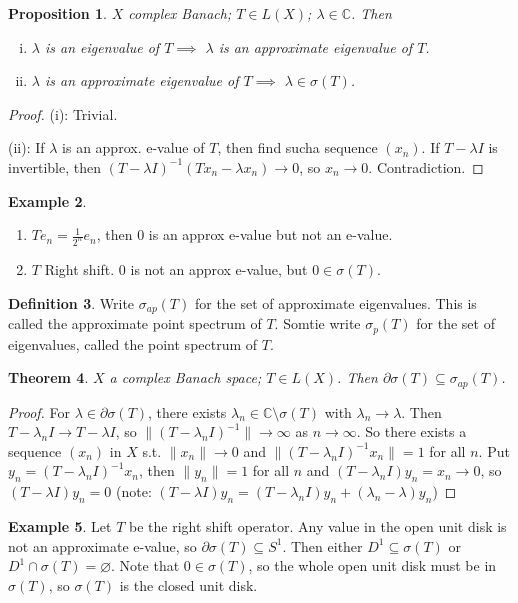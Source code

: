 \documentclass{article}
\theoremstyle{definition}
\newtheorem{defn}{Definition}[section]
\newtheorem{example}[defn]{Example}
\theoremstyle{remark}
\theoremstyle{plain}
\newtheorem{thm}[defn]{Theorem}
\newtheorem{prop}[defn]{Proposition}
\newcommand{\CC}{\mathbb{C}}
\begin{document}
\begin{prop}
    $X$ complex Banach; $T\in L(X)$; $\lambda\in\CC$. Then
    \begin{enumerate}[(i)]
        \item $\lambda$ is an eigenvalue of $T\implies$ $\lambda$ is an approximate eigenvalue of $T$.
        \item $\lambda $ is an approximate eigenvalue of $T\implies$ $\lambda\in\sigma(T)$.
    \end{enumerate}
\end{prop}
\begin{proof}
    (i): Trivial.

    (ii): If $\lambda$ is an approx. e-value of $T$, then find sucha sequence $(x_n)$. If $T-\lambda I$ is invertible, then $(T-\lambda I)^{-1}(Tx_n-\lambda x_n)\to 0$, so $x_n\to 0$. Contradiction.
\end{proof}
\begin{example}
    \begin{enumerate}
        \item $Te_n=\frac1{2^n}e_n$, then $0$ is an approx e-value but not an e-value.
        \item $T$ Right shift. $0$ is not an approx e-value, but $0\in\sigma(T)$.
    \end{enumerate}
\end{example}
\begin{defn}
    Write $\sigma_{ap}(T)$ for the set of approximate eigenvalues. This is called the approximate point spectrum of $T$. Somtie write $\sigma_p(T)$ for the set of eigenvalues, called the point spectrum of $T$.
\end{defn}
\begin{thm}
    $X$ a complex Banach space; $T\in L(X)$. Then $\partial\sigma(T)\subseteq \sigma_{ap}(T)$.
\end{thm}
\begin{proof}
    For $\lambda \in \partial\sigma(T)$, there exists $\lambda_n\in \CC\setminus\sigma(T)$ with $\lambda_n\to \lambda$. Then $T-\lambda_n I\to T-\lambda I$, so $\|(T-\lambda_nI)^{-1}\|\to \infty$ as $n\to\infty$. So there exists a sequence $(x_n)$ in $X$ s.t. $\|x_n\|\to 0$ and $\|(T-\lambda_nI)^{-1}x_n\|=1$ for all $n$. Put $y_n=(T-\lambda_nI)^{-1}x_n$, then $\|y_n\|=1$ for all $n$ and $(T-\lambda_n I)y_n=x_n\to 0$, so $(T-\lambda I)y_n=0$ (note: $(T-\lambda I)y_n=(T-\lambda_n I)y_n+(\lambda_n-\lambda) y_n$)
\end{proof}
\begin{example}
    Let $T$ be the right shift operator. Any value in the open unit disk is not an approximate e-value, so $\partial\sigma(T)\subseteq S^1$. Then either $D^1\subseteq \sigma(T)$ or $D^1\cap \sigma(T)=\varnothing$. Note that $0\in\sigma(T)$, so the whole open unit disk must be in $\sigma(T)$, so $\sigma(T)$ is the closed unit disk.
\end{example}
\end{document}
